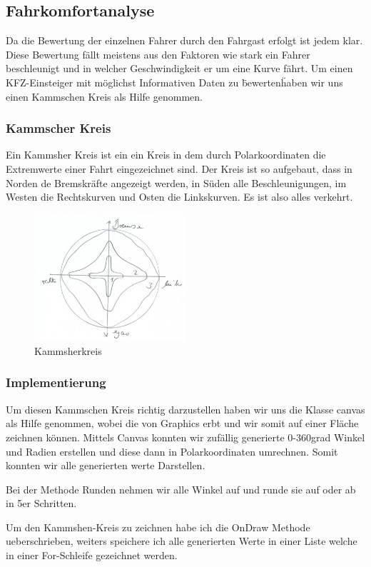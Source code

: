 \subsection{Fahrkomfortanalyse}


Da die Bewertung der einzelnen Fahrer durch den Fahrgast erfolgt ist jedem klar.
Diese Bewertung fällt meistens aus den Faktoren wie stark ein Fahrer beschleunigt und in welcher Geschwindigkeit er um eine Kurve fährt.
Um einen KFZ-Einsteiger mit möglichst Informativen Daten zu \"bewerten\" haben wir uns einen Kammschen Kreis als Hilfe genommen.

\subsubsection{Kammscher Kreis }
Ein Kammsher Kreis ist ein ein Kreis in dem durch Polarkoordinaten die Extremwerte einer Fahrt eingezeichnet sind.
Der Kreis ist so aufgebaut, dass in Norden de Bremskräfte angezeigt werden, in Süden alle Beschleunigungen, im Westen die Rechtskurven und Osten die Linkskurven.
Es ist also alles verkehrt.
\begin{figure}[!htb]\centering
	\includegraphics[width=0.5\textwidth]{images/kammsherkreis}
	\caption{Kammsherkreis \cite{FAIF.CH3-fahrkomfortanalyse.KammscherKreis}}\label{Fig:Kammsher-Kreis}
\end{figure}

\subsubsection{Implementierung}
Um diesen Kammschen Kreis richtig darzustellen haben wir uns die Klasse canvas als Hilfe genommen, wobei die von Graphics erbt und wir somit auf einer Fläche zeichnen können.
Mittels Canvas konnten wir zufällig generierte 0-360grad Winkel und Radien erstellen und diese dann in Polarkoordinaten umrechnen.
Somit konnten wir alle generierten werte Darstellen. 



Bei der Methode Runden nehmen wir alle Winkel auf und runde sie auf oder ab in 5er Schritten.
\newline 



Um den Kammshen-Kreis zu zeichnen habe ich die OnDraw Methode ueberschrieben, weiters speichere ich alle generierten Werte in einer Liste welche in einer For-Schleife gezeichnet werden.
\clearpage %